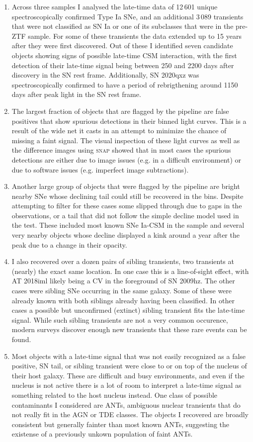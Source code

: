 \documentclass[a4paper,oneside,12pt, class=Latex/Classes/PhDthesisPSnPDF, crop=false]{standalone}
\begin{document}
\begin{enumerate}
	\item Across three samples I analysed the late-time data of 12\,601 unique spectroscopically confirmed Type Ia SNe, and an additional 3\,089 transients that were not classified as SN Ia or one of its subclasses that were in the pre-ZTF sample. For some of these transients the data extended up to 15 years after they were first discovered. Out of these I identified seven candidate objects showing signs of possible late-time CSM interaction, with the first detection of their late-time signal being between 250 and 2200 days after discovery in the SN rest frame. Additionally, SN 2020qxz was spectroscopically confirmed to have a period of rebrigthening around 1150 days after peak light in the SN rest frame.
	\item The largest fraction of objects that are flagged by the pipeline are false positives that show spurious detections in their binned light curves. This is a result of the wide net it casts in an attempt to minimize the chance of missing a faint signal. The visual inspection of these light curves as well as the difference images using \textsc{snap} showed that in most cases the spurious detections are either due to image issues (e.g. in a difficult environment) or due to software issues (e.g. imperfect image subtractions).
	\item Another large group of objects that were flagged by the pipeline are bright nearby SNe whose declining tail could still be recovered in the bins. Despite attempting to filter for these cases some slipped through due to gaps in the observations, or a tail that did not follow the simple decline model used in the test. These included most known SNe Ia-CSM in the sample and several very nearby objects whose decline displayed a kink around a year after the peak due to a change in their opacity.
	\item I also recovered over a dozen pairs of sibling transients, two transients at (nearly) the exact same location. In one case this is a line-of-sight effect, with AT 2018iml likely being a CV in the foreground of SN 2009hz. The other cases were sibling SNe occurring in the same galaxy. Some of these were already known with both siblings already having been classified. In other cases a possible but unconfirmed (extinct) sibling transient fits the late-time signal. While such sibling transients are not a very common occurence, modern surveys discover enough new transients that these rare events can be found.
	\item Most objects with a late-time signal that was not easily recognized as a false positive, SN tail, or sibling transient were close to or on top of the nucleus of their host galaxy. These are difficult and busy environments, and even if the nucleus is not active there is a lot of room to interpret a late-time signal as something related to the host nucleus instead. One class of possible contaminants I considered are ANTs, ambiguous nuclear transients that do not really fit in the AGN or TDE classes. The objects I recovered are broadly consistent but generally fainter than most known ANTs, suggesting the existense of a previously unkown population of faint ANTs.

\end{enumerate}
\end{document}
